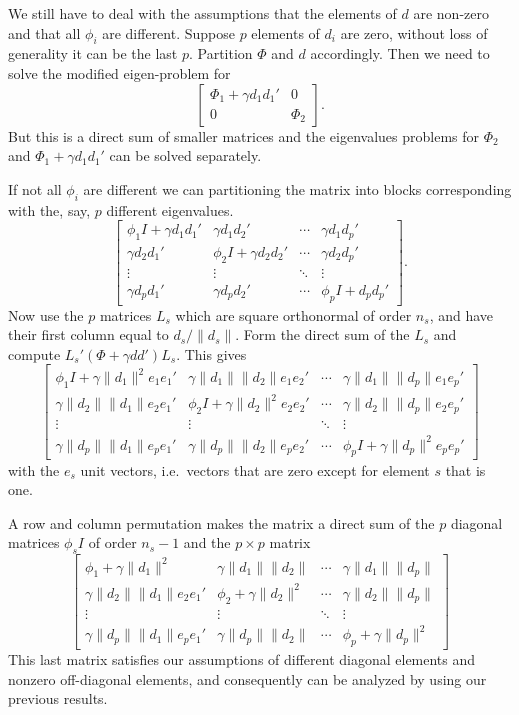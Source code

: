 \documentclass[
  12pt,
]{book}
\begin{document}
We still have to deal with the assumptions that the elements of \(d\) are non-zero and that all \(\phi_i\)
are different. Suppose \(p\) elements of \(d_i\) are zero,
without loss of generality it can be the last \(p\).
Partition \(\Phi\) and \(d\) accordingly.
Then we need to solve the modified eigen-problem for
\[
\begin{bmatrix}
\Phi_1+\gamma d_1d_1'&0\\
0&\Phi_2
\end{bmatrix}.
\]
But this is a direct sum of smaller matrices and the
eigenvalues problems for \(\Phi_2\) and \(\Phi_1+\gamma d_1d_1'\) can be solved separately.

If not all \(\phi_i\) are different we can partitioning the matrix into blocks corresponding with the, say, \(p\) different eigenvalues.
\[
\begin{bmatrix}
\phi_1I+\gamma d_1d_1'&\gamma d_1d_2'&\cdots&\gamma d_1d_p'\\
\gamma d_2d_1'&\phi_2I+\gamma d_2d_2'&\cdots&\gamma d_2d_p'\\
\vdots&\vdots&\ddots&\vdots\\
\gamma d_pd_1'&\gamma d_pd_2'&\cdots&\phi_pI+d_pd_p'
\end{bmatrix}.
\]
Now use the \(p\) matrices \(L_s\) which are square orthonormal of order \(n_s\), and have their first column equal to \(d_s/\|d_s\|.\) Form the direct sum of the \(L_s\) and compute \(L_s'(\Phi+\gamma dd')L_s\). This gives
\[
\begin{bmatrix}
\phi_1I+\gamma\|d_1\|^2 e_1e_1'&\gamma\|d_1\|\|d_2\|e_1e_2'&\cdots&\gamma\|d_1\|\|d_p\|e_1e_p'\\
\gamma\|d_2\|\|d_1\|e_2e_1'&\phi_2I+\gamma\|d_2\|^2e_2e_2'&\cdots&\gamma\|d_2\|\|d_p\|e_2e_p'\\
\vdots&\vdots&\ddots&\vdots\\
\gamma \|d_p\|\|d_1\|e_pe_1'&\gamma \|d_p\|\|d_2\|e_pe_2'&\cdots&\phi_pI+\gamma\|d_p\|^2e_pe_p'
\end{bmatrix}
\]
with the \(e_s\) unit vectors, i.e.~vectors that are zero except for element \(s\) that is one.

A row and column permutation makes the matrix a direct sum of the \(p\) diagonal matrices \(\phi_s I\) of
order \(n_s-1\) and the \(p\times p\) matrix
\[
\begin{bmatrix}
\phi_1+\gamma\|d_1\|^2 &\gamma\|d_1\|\|d_2\|&\cdots&\gamma\|d_1\|\|d_p\|\\
\gamma\|d_2\|\|d_1\|e_2e_1'&\phi_2+\gamma\|d_2\|^2&\cdots&\gamma\|d_2\|\|d_p\|\\
\vdots&\vdots&\ddots&\vdots\\
\gamma \|d_p\|\|d_1\|e_pe_1'&\gamma \|d_p\|\|d_2\|&\cdots&\phi_p+\gamma\|d_p\|^2
\end{bmatrix}
\]
This last matrix satisfies our assumptions of different diagonal elements and nonzero off-diagonal elements, and consequently can be analyzed by using our previous results.
\end{document}
